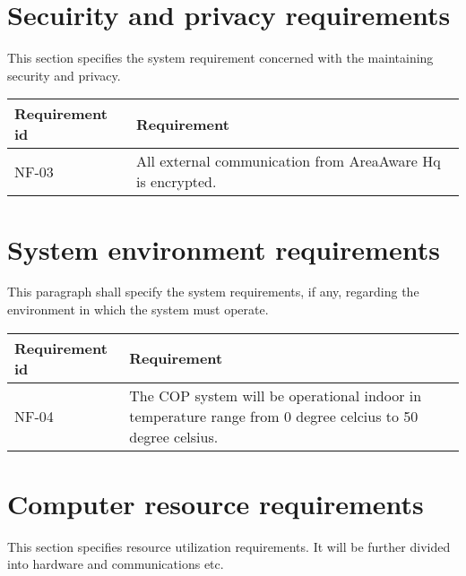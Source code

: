 

\label{sec_nonFunc2}
\section{Secuirity and privacy requirements}
This section specifies the system requirement concerned with the maintaining security and privacy.

\begin{longtable}{| p{3.2cm} |  p{10cm} | }
	\hline
	\textbf{Requirement id} &  \textbf{Requirement } \\
	\hline
	NF-03 & All external communication from AreaAware Hq is encrypted.  \\
	\hline
\end{longtable}

\label{sec_nonFunc3}
\section{System environment requirements}
This paragraph shall specify the system requirements, if any, regarding the environment in which the system must operate.

\begin{longtable}{| p{3.2cm} |  p{10cm} | }
	\hline
	\textbf{Requirement id} &  \textbf{Requirement } \\
	\hline
	NF-04 & The COP system will be operational indoor in temperature range from 0 degree celcius to 50 degree celsius.  \\
	\hline
\end{longtable}

\label{sec_nonFunc4}
\section{Computer resource requirements}
This section specifies resource utilization requirements. It will be further divided into hardware and communications etc.

